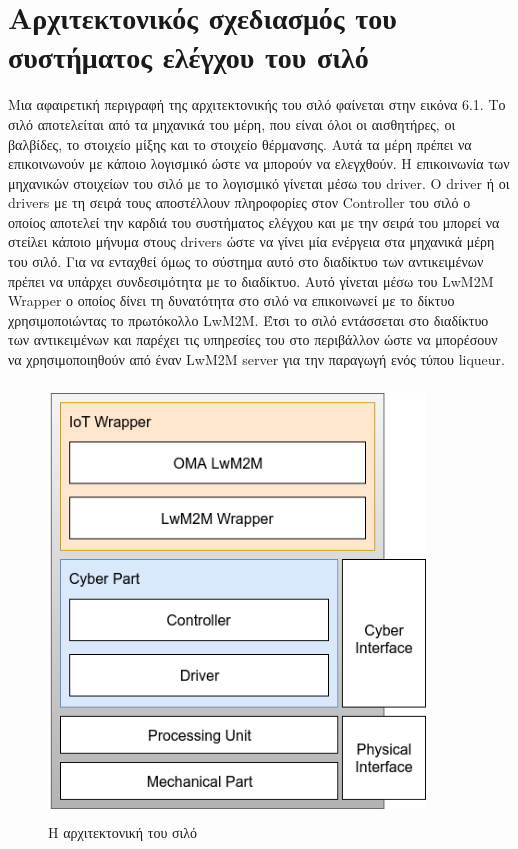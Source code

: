 \section{Αρχιτεκτονικός σχεδιασμός του συστήματος ελέγχου του σιλό}
Μια αφαιρετική περιγραφή της αρχιτεκτονικής του σιλό φαίνεται στην εικόνα 6.1. Το σιλό αποτελείται από τα μηχανικά του μέρη, που είναι όλοι οι αισθητήρες, οι βαλβίδες, το στοιχείο μίξης και το στοιχείο θέρμανσης. Αυτά τα μέρη πρέπει να επικοινωνούν με κάποιο λογισμικό ώστε να μπορούν να ελεγχθούν. Η επικοινωνία των μηχανικών στοιχείων του σιλό με το λογισμικό γίνεται μέσω του driver. Ο driver ή οι drivers με τη σειρά τους αποστέλλουν πληροφορίες στον Controller του σιλό ο οποίος αποτελεί την καρδιά του συστήματος ελέγχου και με την σειρά του μπορεί να στείλει κάποιο μήνυμα στους drivers ώστε να γίνει μία ενέργεια στα μηχανικά μέρη του σιλό. Για να ενταχθεί όμως το σύστημα αυτό στο διαδίκτυο των αντικειμένων πρέπει να υπάρχει συνδεσιμότητα με το διαδίκτυο. Αυτό γίνεται μέσω του LwM2M Wrapper ο οποίος δίνει τη δυνατότητα στο σιλό να επικοινωνεί με το δίκτυο χρησιμοποιώντας το πρωτόκολλο LwM2M. Έτσι το σιλό εντάσσεται στο διαδίκτυο των αντικειμένων και παρέχει τις υπηρεσίες του στο περιβάλλον ώστε να μπορέσουν να χρησιμοποιηθούν από έναν LwM2M server για την παραγωγή ενός τύπου liqueur. 


\begin{figure}[h]
	\centering
		\includegraphics[height=11.5cm,width=10cm]{Figures/12.png}
	\caption{Η αρχιτεκτονική του σιλό}	
\end{figure}

